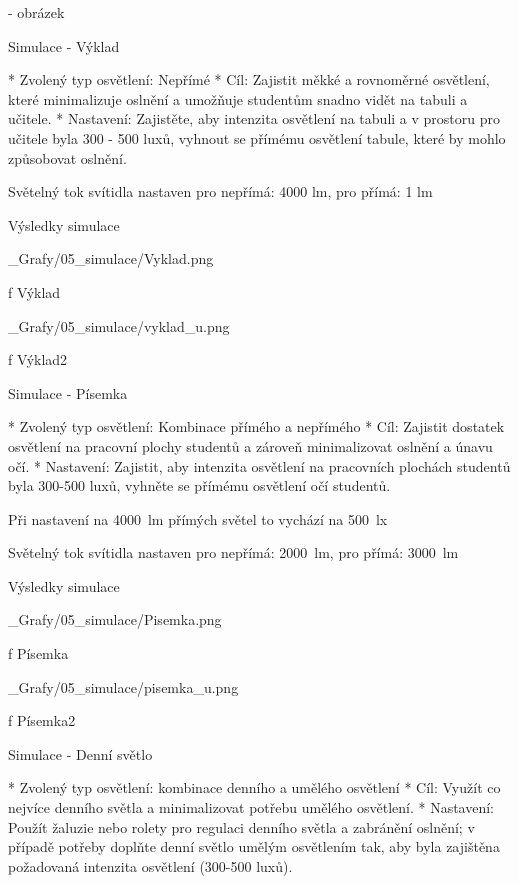 
- obrázek

\sec Simulace - Výklad

\begitems 
* Zvolený typ osvětlení: Nepřímé
* Cíl: Zajistit měkké a rovnoměrné osvětlení, které minimalizuje oslnění a umožňuje studentům snadno vidět na tabuli a učitele.
* Nastavení: Zajistěte, aby intenzita osvětlení na tabuli a v prostoru pro učitele byla 300 - 500 luxů, vyhnout se přímému osvětlení tabule, které by mohlo způsobovat oslnění.
\enditems

\noindent Světelný tok svítidla nastaven pro nepřímá: 4000 lm, pro přímá: 1 lm

\secc Výsledky simulace

\medskip {}
\picw=10cm _Grafy/05_simulace/Vyklad.png
\caption/f Výklad
\medskip

\medskip {}
\picw=10cm _Grafy/05_simulace/vyklad_u.png
\caption/f Výklad2
\medskip

\sec Simulace - Písemka

\begitems
* Zvolený typ osvětlení: Kombinace přímého a nepřímého
* Cíl: Zajistit dostatek osvětlení na pracovní plochy studentů a zároveň minimalizovat oslnění a únavu očí.
* Nastavení: Zajistit, aby intenzita osvětlení na pracovních plochách studentů byla 300-500 luxů, vyhněte se přímému osvětlení očí studentů.
\enditems


\noindent Při nastavení na 4000~lm přímých světel to vychází na 500~lx

\noindent Světelný tok svítidla nastaven pro nepřímá: 2000~lm, pro přímá: 3000~lm

\secc Výsledky simulace

\medskip {}
\picw=10cm _Grafy/05_simulace/Pisemka.png
\caption/f Písemka
\medskip

\medskip {}
\picw=10cm _Grafy/05_simulace/pisemka_u.png
\caption/f Písemka2
\medskip

\sec Simulace - Denní světlo

\begitems 
* Zvolený typ osvětlení: kombinace denního a umělého osvětlení
* Cíl: Využít co nejvíce denního světla a minimalizovat potřebu umělého osvětlení.
* Nastavení: Použít žaluzie nebo rolety pro regulaci denního světla a zabránění oslnění; v případě potřeby doplňte denní světlo umělým osvětlením tak, aby byla zajištěna požadovaná intenzita osvětlení (300-500 luxů).
\enditems

